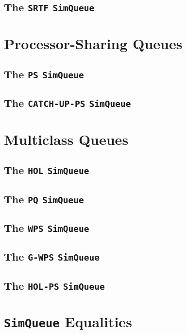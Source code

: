 \documentclass[12pt]{book}
\begin{document}
\subsection{The \lstinline{SRTF} \lstinline{SimQueue}}

\section{Processor-Sharing Queues}

\subsection{The \lstinline{PS} \lstinline{SimQueue}}

\subsection{The \lstinline{CATCH-UP-PS} \lstinline{SimQueue}}

\section{Multiclass Queues}

\subsection{The \lstinline{HOL} \lstinline{SimQueue}}

\subsection{The \lstinline{PQ} \lstinline{SimQueue}}

\subsection{The \lstinline{WPS} \lstinline{SimQueue}}

\subsection{The \lstinline{G-WPS} \lstinline{SimQueue}}

\subsection{The \lstinline{HOL-PS} \lstinline{SimQueue}}

\section{\lstinline|SimQueue| Equalities}
\end{document}
